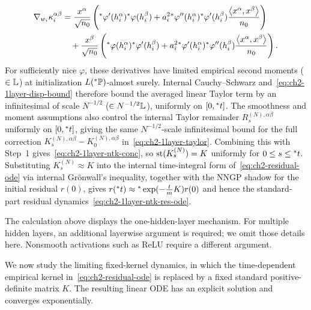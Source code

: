 \begin{proofsketch}
\begin{align}
\nabla_{w_i} \kappa_i^{\alpha\beta} &= \frac{x^\alpha}{\sqrt{n_0}} \left( {}^*\varphi'(h_i^\alpha){}^*\varphi(h_i^\beta) + a_i^2 {}^*\varphi''(h_i^\alpha){}^*\varphi'(h_i^\beta) \frac{\left\langle x^\alpha, x^\beta \right\rangle}{n_0} \right) \nonumber \\
&\quad + \frac{x^\beta}{\sqrt{n_0}} \left( {}^*\varphi(h_i^\alpha){}^*\varphi'(h_i^\beta) + a_i^2 {}^*\varphi'(h_i^\alpha){}^*\varphi''(h_i^\beta) \frac{\left\langle x^\alpha, x^\beta \right\rangle}{n_0} \right). \label{eq:ch2-1layer-dkappa-dw}
\end{align}
For sufficiently nice $\varphi$, these derivatives have limited empirical second moments ($\in \mathbb{L}$) at initialization $L({}^*\mathbb{P})$-almost surely. Internal Cauchy--Schwarz and~\eqref{eq:ch2-1layer-disp-bound} therefore bound the averaged linear Taylor term by an infinitesimal of scale $N^{-1/2}$ ($\in N^{-1/2}\mathbb{L}$), uniformly on $[0, {}^*t]$. The smoothness and moment assumptions also control the internal Taylor remainder $R_s^{(N),\alpha\beta}$ uniformly on $[0, {}^*t]$, giving the same $N^{-1/2}$-scale infinitesimal bound for the full correction $K_s^{(N),\alpha\beta} - K_0^{(N),\alpha\beta}$ in~\eqref{eq:ch2-1layer-taylor}. Combining this with Step~1 gives~\eqref{eq:ch2-1layer-ntk-conc}, so $\operatorname{st}(K_s^{(N)}) = K$ uniformly for $0 \le s \le {}^*t$. Substituting $K_s^{(N)} \approx K$ into the internal time-integral form of~\eqref{eq:ch2-residual-ode} via internal Gr\"onwall's inequality, together with the NNGP shadow for the initial residual $r(0)$, gives $r({}^*t) \approx {}^*\exp(-\frac{t}{m}K)r(0)$ and hence the standard-part residual dynamics~\eqref{eq:ch2-1layer-ntk-res-ode}.
\end{proofsketch}

\begin{remark}\label{rem:ch2-scope-sketch}
The calculation above displays the one-hidden-layer mechanism. For multiple hidden layers, an additional layerwise argument is required; we omit those details here. Nonsmooth activations such as ReLU require a different argument.
\end{remark}

We now study the limiting fixed-kernel dynamics, in which the time-dependent empirical kernel in~\eqref{eq:ch2-residual-ode} is replaced by a fixed standard positive-definite matrix $K$. The resulting linear ODE has an explicit solution and converges exponentially.

